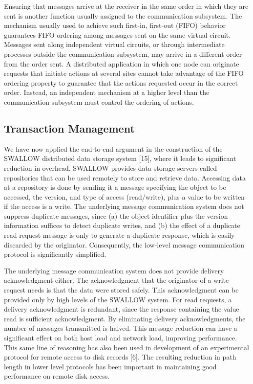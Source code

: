 \documentclass[a4paper,12pt,notitlepage,twoside,openright]{article}
\begin{document}
Ensuring that messages arrive at the receiver in the same order in which
they are sent is another function usually assigned to the communication
subsystem. The mechanism usually used to achieve such first-in,
first-out (FIFO) behavior guarantees FIFO ordering among messages sent
on the same virtual circuit. Messages sent along independent virtual
circuits, or through intermediate processes outside the communication
subsystem, may arrive in a different order from the order sent. A
distributed application in which one node can originate requests that
initiate actions at several sites cannot take advantage of the FIFO
ordering property to guarantee that the actions requested occur in the
correct order. Instead, an independent mechanism at a higher level than
the communication subsystem must control the ordering of actions.

\hypertarget{transaction-management}{%
\subsection{Transaction Management}\label{transaction-management}}

We have now applied the end-to-end argument in the construction of the
SWALLOW distributed data storage system {[}15{]}, where it leads to
significant reduction in overhead. SWALLOW provides data storage servers
called repositories that can be used remotely to store and retrieve
data. Accessing data at a repository is done by sending it a message
specifying the object to be accessed, the version, and type of access
(read/write), plus a value to be written if the access is a write. The
underlying message communication system does not suppress duplicate
messages, since (a) the object identifier plus the version information
suffices to detect duplicate writes, and (b) the effect of a duplicate
read-request message is only to generate a duplicate response, which is
easily discarded by the originator. Consequently, the low-level message
communication protocol is significantly simplified.

The underlying message communication system does not provide delivery
acknowledgment either. The acknowledgment that the originator of a write
request needs is that the data were stored safely. This acknowledgment
can be provided only by high levels of the SWALLOW system. For read
requests, a delivery acknowledgment is redundant, since the response
containing the value read is sufficient acknowledgment. By eliminating
delivery acknowledgments, the number of messages transmitted is halved.
This message reduction can have a significant effect on both host load
and network load, improving performance. This same line of reasoning has
also been used in development of an experimental protocol for remote
access to disk records {[}6{]}. The resulting reduction in path length
in lower level protocols has been important in maintaining good
performance on remote disk access.
\end{document}
